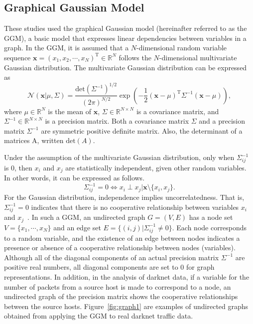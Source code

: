 \documentclass[letterpaper]{sig-alternate-10pt}
\begin{document}
\subsection{Graphical Gaussian Model}
These studies used the graphical Gaussian model (hereinafter referred to as the GGM), a basic model that expresses linear dependencies between variables in a graph.
In the GGM, it is assumed that a $N$-dimensional random variable sequence $\bm{x}=(x_{1},x_{2},\cdots,x_{N})^\mathrm{T}\in\mathbb{R}^N$ follows the $N$-dimensional multivariate Gaussian distribution.
The multivariate Gaussian distribution can be expressed as
\begin{equation*}
\mathcal{N}({\bm{x}}|\mu,\Sigma)=\frac{\mathrm{det} (\Sigma^{-1})^{1/2}}{(2\pi)^{N/2}}\exp\left(-\frac{1}{2}(\bm{x}-\mu)^\mathrm{T}{\Sigma^{-1}}(\bm{x}-\mu)\right),
\end{equation*}
where $\mu\in\mathbb{R}^N$ is the mean of $\bm{x}$, $\Sigma\in\mathbb{R}^{N \times N}$ is a covariance matrix, and $\Sigma^{-1}\in\mathbb{R}^{N \times N}$ is a precision matrix.
Both a covariance matrix $\Sigma$ and a precision matrix $\Sigma^{-1}$ are symmetric positive definite matrix.
Also, the determinant of a matrices A, written $\mathrm{det}(A)$.

Under the assumption of the multivariate Gaussian distribution, only when $\Sigma^{-1}_{ij}$ is ​​0, then $x_ {i}$ and $x_ {j}$ are statistically independent, given other random variables.
In other words, it can be expressed as follows.
\begin{equation*}
\Sigma^{-1}_{ij}=0\Leftrightarrow x_i \perp x_j | \bm{x} \setminus \{ x_i, x_j \}.
\end{equation*}
For the Gaussian distribution, independence implies uncorrelatedness.
That is, $\Sigma^{-1}_{ij}=0$ indicates that there is no cooperative relationship between variables $x_{i}$ and $x_{j}$~\cite{Ide}.
In such a GGM, an undirected graph $G = (V, E)$ has a node set $V=\{x_{1}, \cdots, x_{N}\}$ and an edge set $E=\{(i,j)|\Sigma^{-1}_{ij}\neq0\}$.
Each node corresponds to a random variable, and the existence of an edge between nodes indicates a presence or absence of a cooperative relationship between nodes (variables).
Although all of the diagonal components of an actual precision matrix $\Sigma^{-1}$ are positive real numbers, all diagonal components are set to 0 for graph representations.
In addition, in the analysis of darknet data, if a variable for the number of packets from a source host is made to correspond to a node, an undirected graph of the precision matrix shows the cooperative relationships between the source hosts.
Figure~\ref{fig:graph1} are examples of undirected graphs obtained from applying the GGM to real darknet traffic data.
\end{document}
